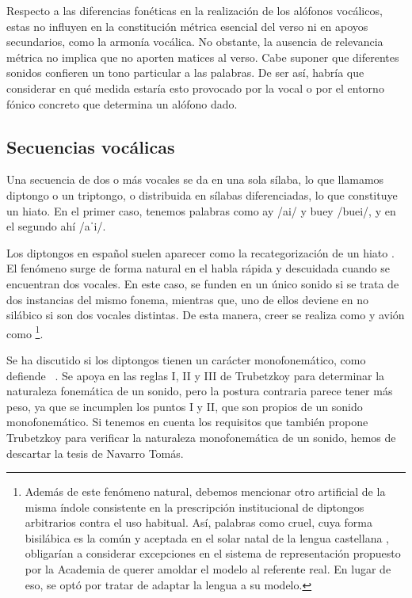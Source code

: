 Respecto a las diferencias fonéticas en la realización de los alófonos vocálicos, estas no influyen en la constitución métrica esencial del verso ni en apoyos secundarios, como la armonía vocálica. No obstante, la ausencia de relevancia métrica no implica que no aporten matices al verso. Cabe suponer que diferentes sonidos confieren un tono particular a las palabras. De ser así, habría que considerar en qué medida estaría esto provocado por la vocal o por el entorno fónico concreto que determina un alófono dado.
 
\subsection{Secuencias vocálicas}\label{sec:diptongo}
Una secuencia de dos o más vocales se da en una sola sílaba, lo que llamamos diptongo o un triptongo, o distribuida en sílabas diferenciadas, lo que constituye un hiato. En el primer caso, tenemos palabras como \textlangle{}ay\textrangle{} /ai/ y \textlangle{}buey\textrangle{} /buei/, y en el segundo \textlangle{}ahí\textrangle{} /aˈi/. 

Los diptongos en español suelen aparecer como la recategorización de un hiato \parencite{chitoran2007}. El fenómeno surge de forma natural en el habla rápida y descuidada cuando se encuentran dos vocales. En este caso, se funden en un único sonido si se trata de dos instancias del mismo fonema, mientras que, uno de ellos deviene en no silábico si son dos vocales distintas. De esta manera, \textlangle{}creer\textrangle{} se realiza como \ipa{[kɾeɾ]} y  \textlangle{}avión\textrangle{} como \ipa{[aˈBjon]}\footnote{Además de este fenómeno natural, debemos mencionar otro artificial de la misma índole consistente en la prescripción institucional de diptongos arbitrarios contra el uso habitual. Así, palabras como \textlangle{}cruel\textrangle{}, cuya forma bisilábica es la común y aceptada en el solar natal de la lengua castellana \parencite[185-186]{quilis2019}, obligarían a considerar excepciones en el sistema de representación propuesto por la Academia de querer amoldar el modelo al referente real. En lugar de eso, se optó por tratar de adaptar la lengua a su modelo.}.

Se ha discutido si los diptongos tienen un carácter monofonemático, como defiende \citeauthor{navarrotomas1946}~\parencite*[13-14]{navarrotomas1946}. Se apoya en las reglas I, II y III de Trubetzkoy \parencite*[42-45]{trubetzkoy1939} para determinar la naturaleza fonemática de un sonido, pero la postura contraria \parencite[§ 96]{alarcos1964} parece tener más peso, ya que se incumplen los puntos I y II, que son propios de un sonido monofonemático. Si tenemos en cuenta los requisitos que también propone Trubetzkoy \parencite*[50-52]{trubetzkoy1939} para verificar la naturaleza monofonemática de un sonido, hemos de descartar la tesis de Navarro Tomás.

